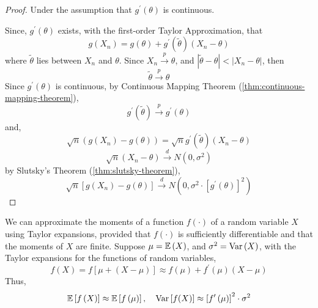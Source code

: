 \begin{proof}
	Under the assumption that \(g^{\prime}(\theta)\) is continuous.

	Since, \(g^{\prime}(\theta)\) exists, with the first-order Taylor Approximation, that
	\begin{equation*}
		g(X_n)=g(\theta)+g^{\prime}(\tilde{\theta})(X_n-\theta)
	\end{equation*}
	where \(\tilde{\theta}\) lies between \(X_n\) and \(\theta\).
	Since \(X_n\stackrel{p}{\rightarrow}\theta\), and \(|\tilde{\theta}-\theta|<|X_n-\theta|\), then
	\begin{equation*}
		\tilde{\theta}\stackrel{p}{\rightarrow}\theta
	\end{equation*}
	Since \(g^{\prime}(\theta)\) is continuous, by Continuous Mapping Theorem (\ref{thm:continuous-mapping-theorem}),
	\begin{equation*}
		g^{\prime}(\tilde{\theta})\stackrel{p}{\rightarrow}g^{\prime}(\theta)
	\end{equation*}
	and,
	\begin{equation*}
		\sqrt{n}\left(g(X_n)-g(\theta)\right)=\sqrt{n}g^{\prime}(\tilde{\theta})(X_n-\theta)
	\end{equation*}
	\begin{equation*}
		\sqrt{n}\left(X_{n}-\theta\right)\stackrel{d}{\rightarrow}N\left(0,\sigma^{2}\right)
	\end{equation*}
	by Slutsky's Theorem (\ref{thm:slutsky-theorem}),
	\begin{equation*}
		\sqrt{n}\left[g\left(X_{n}\right)-g(\theta)\right] \stackrel{d}{\rightarrow}N\left(0,\sigma^{2}\cdot\left[g^{\prime}(\theta)\right]^{2}\right)
	\end{equation*}
\end{proof}

\begin{theorem}

\end{theorem}

\begin{remark}
	We can approximate the moments of a function \(f(\cdot)\) of a random variable \(X\) using Taylor expansions, provided that \(f(\cdot)\) is sufficiently differentiable and that the moments of \(X\) are finite. Suppose \(\mu=\mathbb{E}\left(X\right)\), and \(\sigma^{2}=\mathrm{Var}\left(X\right)\), with the Taylor expansions for the functions of random variables,
	\begin{equation}
		f\left(X\right)=f\left[\mu+\left(X-\mu\right)\right]\approx f\left(\mu\right)+f^{\prime}\left(\mu\right)\left(X-\mu\right)
	\end{equation}
	Thus,
	\begin{equation}
		\mathbb{E}\left[f\left(X\right)\right]\approx\mathbb{E}\left[f\left(\mu\right)\right],\quad\mathrm{Var}\left[f(X)\right]\approx\left[f^{\prime}\left(\mu\right)\right]^{2}\cdot\sigma^{2}
	\end{equation}
\end{remark}

